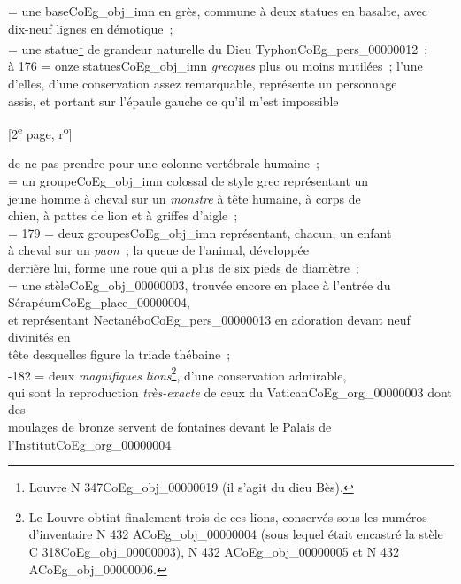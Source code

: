 \documentclass{book}
\begin{document}
 = une base\gls{CoEg_obj_imn} en grès, commune à deux statues en basalte, avec\\
dix-neuf lignes en démotique~;\\
 = une statue\footnote{Louvre N 347\gls{CoEg_obj_00000019} (il s'agit du dieu Bès).} de grandeur naturelle du Dieu Typhon\gls{CoEg_pers_00000012}~;\\
 à 176 = onze statues\gls{CoEg_obj_imn} \textit{grecques} plus ou moins mutilées~; l’une\\
d’elles, d’une conservation assez remarquable, représente un personnage\\
assis, et portant sur l’épaule gauche ce qu’il m’est impossible
{\footnotesize \begin{center} {[2\textsuperscript{e} page, r\textsuperscript{o}]}\end{center}}
\noindent de ne pas prendre pour une colonne vertébrale humaine~;\\
 = un groupe\gls{CoEg_obj_imn} colossal de style grec représentant un\\
jeune homme à cheval sur un \textit{monstre} à tête humaine, à corps de\\
chien, à pattes de lion et à griffes d’aigle~;\\
 = 179 = deux groupes\gls{CoEg_obj_imn} représentant, chacun, un enfant\\
à cheval sur un \textit{paon}~; la queue de l’animal, développée\\
derrière lui, forme une roue qui a plus de six pieds de diamètre~;\\
 = une stèle\gls{CoEg_obj_00000003}, trouvée encore en place à l’entrée du Sérapéum\gls{CoEg_place_00000004},\\
et représentant Nectanébo\gls{CoEg_pers_00000013} en adoration devant neuf divinités en\\
tête desquelles figure la triade thébaine~;\\
-182 = deux \textit{magnifiques lions}\footnote{Le Louvre obtint finalement trois de ces lions, conservés sous les numéros d'inventaire N 432 A\gls{CoEg_obj_00000004} (sous lequel était encastré la stèle C 318\gls{CoEg_obj_00000003}), N 432 A\gls{CoEg_obj_00000005} et N 432 A\gls{CoEg_obj_00000006}.}, d’une conservation admirable,\\
qui sont la reproduction \textit{très-exacte} de ceux du Vatican\gls{CoEg_org_00000003} dont des\\
moulages de bronze servent de fontaines devant le Palais de l’Institut\gls{CoEg_org_00000004}\\
\end{document}
